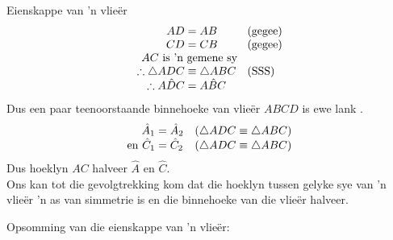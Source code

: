 \begin{wex}{Eienskappe van 'n vlie\"er}
{\begin{equation*}
\begin{array}{r@{\;}l@{\quad}l}
AD &= AB & \mbox{(gegee)} \\
CD &= CB &  \mbox{(gegee)} \\
    \multicolumn{2}{c}{AC \mbox{ is 'n gemene sy}} & \\
\therefore \triangle ADC &\equiv \triangle ABC &  \mbox{(SSS)} \\
\therefore A \hat{D}C &= A \hat{B}C & \\
\end{array}
\end{equation*}
Dus een paar teenoorstaande binnehoeke van vlie\"er $ABCD$ is ewe lank .
\begin{equation*}
 \begin{array}{r@{\;}l@{\quad}l}
 \hat{A}_{1} &= \hat{A}_{2} & \mbox{($\triangle ADC \equiv \triangle ABC$)} \\ 
\mbox{en }\hat{C}_{1} &= \hat{C}_{2} &  \mbox{($\triangle ADC \equiv \triangle ABC$)}\\ 
\end{array}
\end{equation*}
 Dus hoeklyn $AC$ halveer $\hat{A}$ en $\hat{C}$. \\
Ons kan tot die gevolgtrekking kom dat die hoeklyn tussen gelyke sye van 'n vlie\"er 'n as van simmetrie is en die binnehoeke van die vlie\"er halveer.
}
\end{wex}

\clearpage

Opsomming van die eienskappe van 'n vlie\"er:

